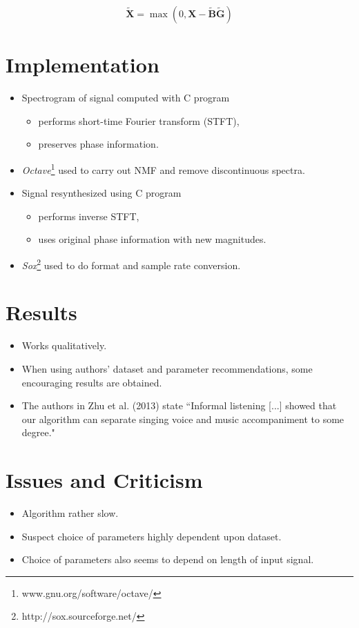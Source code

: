 \documentclass[72pt]{article}
\begin{document}
\begin{Huge}
\[
\mathbf{\tilde{X}} = \max(0,\mathbf{X} -
\mathbf{\tilde{B}}\mathbf{\tilde{G}})
\]

\newpage

\section*{Implementation}
\begin{itemize}
    \item Spectrogram of signal computed with C program
        \begin{itemize}
            \item performs short-time Fourier transform (STFT),
            \item preserves phase information.
        \end{itemize}
    \item \textit{Octave}\footnote{www.gnu.org/software/octave/} used to carry
        out NMF and remove discontinuous spectra.
    \item Signal resynthesized using C program
        \begin{itemize}
            \item performs inverse STFT,
            \item uses original phase information with new magnitudes.
        \end{itemize}
    \item \textit{Sox}\footnote{http://sox.sourceforge.net/} used to do format
        and sample rate conversion.
\end{itemize}

\newpage

\section*{Results}
\begin{itemize}
    \item Works qualitatively.
    \item When using authors' dataset and parameter recommendations, some
encouraging results are obtained.
    \item The authors in Zhu et al. (2013) state ``Informal listening [...]
showed that our algorithm can separate singing voice and music accompaniment to
some degree."
\end{itemize}

\newpage

\section*{Issues and Criticism}
\begin{itemize}
    \item Algorithm rather slow.
    \item Suspect choice of parameters highly dependent upon dataset.
    \item Choice of parameters also seems to depend on length of input signal.
\end{itemize}


\end{Huge}
\end{document}
